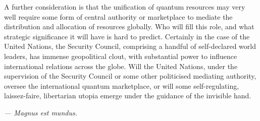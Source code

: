 A further consideration is that the unification of quantum resources may very well require some form of central authority or marketplace to mediate the distribution and allocation of resources globally. Who will fill this role, and what strategic significance it will have is hard to predict. Certainly in the case of the United Nations, the Security Council, comprising a handful of self-declared world leaders, has immense geopolitical clout, with substantial power to influence international relations across the globe. Will the United Nations, under the supervision of the Security Council or some other politicised mediating authority, oversee the international quantum marketplace, or will some self-regulating, laissez-faire, libertarian utopia emerge under the guidance of the invisible hand. 

\textit{--- Magnus est mundus.}